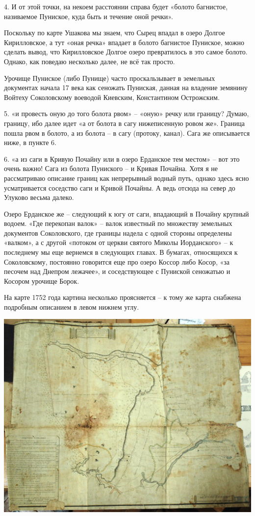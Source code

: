 4. И от этой точки, на некоем расстоянии справа будет «болото багнистое, називаемое Пуниское, куда быть и течение оной речки».

Поскольку по карте Ушакова мы знаем, что Сырец впадал в озеро Долгое Кирилловское, а тут «оная речка» впадает в болото багнистое Пуниское, можно сделать вывод, что Кирилловское Долгое озеро превратилось в это самое болото. Однако, как поведаю несколько далее, не всё так просто.

Урочище Пуниское (либо Пунище) часто проскальзывает в земельных документах начала 17 века как сеножать Пуниская, данная на владение земянину Войтеху Соколовскому воеводой Киевским, Константином Острожским.

5. «и провесть оную до того болота рвом» – «оную» речку или границу? Думаю, границу, ибо далее идет «а от болота в сагу нижеписенную ровом же». Граница пошла рвом в болото, а из болота – в сагу (протоку, канал). Сага же описывается ниже, в пункте 6.

6. «а из саги в Кривую Почайну или в озеро Ерданское тем местом» – вот это очень важно! Сага из болота Пуниского – и Кривая Почайна. Хотя я не рассматриваю описание границ как непрерывный водный путь, однако здесь ясно усматривается соседство саги и Кривой Почайны. А ведь отсюда на север до Улуково весьма далеко.

Озеро Ерданское же – следующий к югу от саги, впадающий в Почайну крупный водоем. «Где перекопан валок» – валок известный по множеству земельных документов Соколовского, где границы надела с одной стороны определены «валком», а с другой «потоком от церкви святого Миколы Иорданского» – к последнему мы еще вернемся в следующих главах. В бумагах, относящихся к Соколовскому, постоянно говорится еще про озеро Коссор либо Косор, «за песочем над Днепром лежачее», и соседствующее с Пуниской сеножатью и Косором урочище Борок.

На карте 1752 года картина несколько проясняется – к тому же карта снабжена подробным описанием в левом нижнем углу.

\begin{center}
\includegraphics[width=\linewidth]{chast-colebanie-osnov/pochayna/map1752.jpg}
\end{center}

